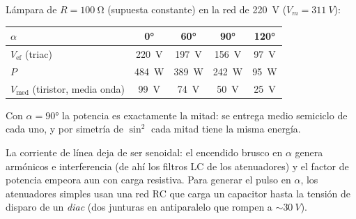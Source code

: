 \begin{ejemplo}
Lámpara de $R=\SI{100}{\ohm}$ (supuesta constante) en la red de \SI{220}{V} ($V_m=\SI{311}{V}$):
\begin{center}\small
\begin{tabular}{lcccc}
\toprule
$\alpha$ & \ang{0} & \ang{60} & \ang{90} & \ang{120} \\
\midrule
$V_{\mathrm{ef}}$ (triac) & \SI{220}{V} & \SI{197}{V} & \SI{156}{V} & \SI{97}{V} \\
$P$ & \SI{484}{W} & \SI{389}{W} & \SI{242}{W} & \SI{95}{W} \\
$V_{\mathrm{med}}$ (tiristor, media onda) & \SI{99}{V} & \SI{74}{V} & \SI{50}{V} & \SI{25}{V} \\
\bottomrule
\end{tabular}
\end{center}
Con $\alpha=\ang{90}$ la potencia es exactamente la mitad: se entrega medio semiciclo de cada
uno, y por simetría de $\sin^2$ cada mitad tiene la misma energía.
\end{ejemplo}

\begin{intuicion}
La corriente de línea deja de ser senoidal: el encendido brusco en $\alpha$ genera armónicos e
interferencia (de ahí los filtros LC de los atenuadores) y el factor de potencia empeora aun con
carga resistiva. Para generar el pulso en $\alpha$, los atenuadores simples usan una red RC que
carga un capacitor hasta la tensión de disparo de un \emph{diac} (dos junturas en antiparalelo que
rompen a $\sim\SI{30}{V}$).
\end{intuicion}
